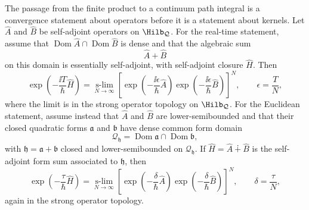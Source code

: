 \begin{theorem}
\label{qthm:trotter-product-formula-qm}
The passage from the finite product to a continuum path integral is a
convergence statement about operators before it is a statement about kernels.
Let \(\widehat A\) and \(\widehat B\) be self-adjoint operators on
\(\Hilb_{\mathcal Q}\).  For the real-time statement, assume that
\(\operatorname{Dom}\widehat A\cap\operatorname{Dom}\widehat B\) is dense and
that the algebraic sum
\[
  \widehat A+\widehat B
\]
on this domain is essentially self-adjoint, with self-adjoint closure
\(\widehat H\).  Then
\[
  \exp\left(-\frac{\ii T}{\hbar}\widehat H\right)
  =
  \operatorname*{s-lim}_{N\to\infty}
  \left[
    \exp\left(-\frac{\ii\epsilon}{\hbar}\widehat A\right)
    \exp\left(-\frac{\ii\epsilon}{\hbar}\widehat B\right)
  \right]^N,
  \qquad
  \epsilon=\frac{T}{N},
\]
where the limit is in the strong operator topology on \(\Hilb_{\mathcal Q}\).
For the Euclidean statement, assume instead that \(\widehat A\) and
\(\widehat B\) are lower-semibounded and that their closed quadratic forms
\(\mathfrak a\) and \(\mathfrak b\) have dense common form domain
\[
  \mathcal Q_{\mathfrak h}
  =
  \operatorname{Dom}\mathfrak a\cap\operatorname{Dom}\mathfrak b ,
\]
with \(\mathfrak h=\mathfrak a+\mathfrak b\) closed and lower-semibounded on
\(\mathcal Q_{\mathfrak h}\).  If \(\widehat H=\widehat A\dotplus\widehat B\)
is the self-adjoint form sum associated to \(\mathfrak h\), then
\[
  \exp\left(-\frac{\tau}{\hbar}\widehat H\right)
  =
  \operatorname*{s-lim}_{N\to\infty}
  \left[
    \exp\left(-\frac{\delta}{\hbar}\widehat A\right)
    \exp\left(-\frac{\delta}{\hbar}\widehat B\right)
  \right]^N,
  \qquad
  \delta=\frac{\tau}{N},
\]
again in the strong operator topology.
\end{theorem}


